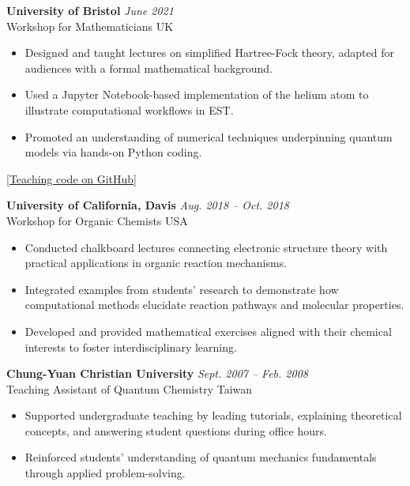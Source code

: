 {\bf University of Bristol}  \hfill \textit{June 2021} \\
Workshop for Mathematicians  \hfill UK
\begin{itemize}
    \setlength\itemsep{0em}
    \item Designed and taught lectures on simplified Hartree-Fock theory, adapted for audiences with a formal mathematical background.
    \item Used a Jupyter Notebook-based implementation of the helium atom to illustrate computational workflows in EST.
    \item Promoted an understanding of numerical techniques underpinning quantum models via hands-on Python coding. 
\end{itemize}
\vspace{-2.2em} \hfill \href{https://github.com/HHChuang/HartreeFockPractice/blob/master/src/He_atom.ipynb}{[Teaching code on GitHub]}

{\bf University of California, Davis}  \hfill \textit{Aug. 2018 -- Oct. 2018} \\
Workshop for Organic Chemists \hfill USA
\begin{itemize}
    \item Conducted chalkboard lectures connecting electronic structure theory with practical applications in organic reaction mechanisms.
    \item Integrated examples from students' research to demonstrate how computational methods elucidate reaction pathways and molecular properties.
    \item Developed and provided mathematical exercises aligned with their chemical interests to foster interdisciplinary learning.
\end{itemize}

{\bf  Chung-Yuan Christian University } \hfill   \textit{Sept. 2007 -- Feb. 2008} \\
Teaching Assistant of Quantum Chemistry \hfill Taiwan
\begin{itemize}
    \setlength\itemsep{0em}
    \item Supported undergraduate teaching by leading tutorials, explaining theoretical concepts, and answering student questions during office hours.
    \item Reinforced students' understanding of quantum mechanics fundamentals through applied problem-solving.
\end{itemize}


